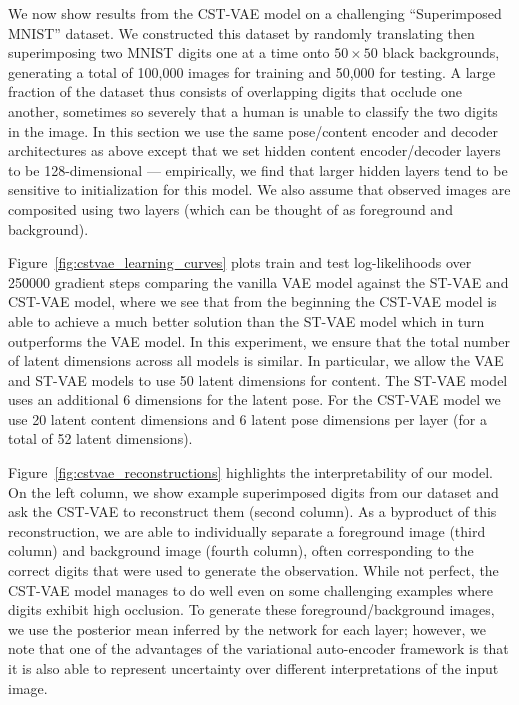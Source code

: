 
We now show results from the CST-VAE model on a challenging ``Superimposed MNIST'' dataset.
We constructed this dataset
by randomly translating then superimposing two MNIST digits one at a time onto $50\times 50$ black backgrounds,
generating a total of 100,000 images for training and 50,000 for testing.  
A large fraction of the dataset thus consists of overlapping digits that occlude one another, sometimes so severely that
a human is unable to classify the two digits in the image.
In this section we use the same pose/content encoder and decoder
architectures as above except that we set hidden content encoder/decoder layers to be 128-dimensional --- empirically,
we find that larger hidden layers tend to be sensitive to initialization for this model.
We also assume that observed images are composited
using two layers (which can be thought of as foreground and background).

Figure~\ref{fig:cstvae_learning_curves}
plots train and test log-likelihoods over 250000 gradient steps
comparing the vanilla VAE model against the ST-VAE and CST-VAE model, where 
we see that from the beginning the CST-VAE
model is able to achieve a much better solution than the ST-VAE model
which in turn outperforms the VAE model.  
In this experiment, we ensure that the total number of latent dimensions across all
models is similar.
In particular, 
we allow the VAE and ST-VAE models to use 50 latent dimensions for content.
The ST-VAE model uses an additional 6 dimensions for the latent pose.
For the CST-VAE model we use 20 latent content dimensions
and 6 latent pose dimensions per layer (for a total of 52 latent dimensions). 


Figure~\ref{fig:cstvae_reconstructions} highlights the interpretability of our model.
On the left column, we show example superimposed digits from our dataset and ask the 
CST-VAE to reconstruct them (second column).  As a byproduct of this reconstruction,
we are able to individually separate a foreground image (third column) and background image (fourth column),
often corresponding to the correct digits that were used to generate the observation.  
 While not perfect, the CST-VAE model manages to do well even on some challenging examples where
 digits exhibit high occlusion.  To generate these foreground/background images, we use the posterior mean
 inferred by the network for each layer; however, we note that one of the advantages of the 
 variational auto-encoder framework is that it is also able to represent uncertainty over different interpretations
 of the input image.

